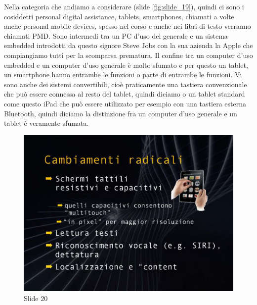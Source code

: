 Nella categoria che andiamo a considerare (slide \ref{fig:slide_19}),  quindi ci sono i cosiddetti personal digital assistance, tablets, smartphones, chiamati a volte anche personal mobile devices, spesso nel corso e anche nei libri di testo verranno chiamati PMD.
Sono intermedi tra un PC d'uso del generale e un sistema embedded introdotti da questo signore Steve Jobs con la sua azienda la Apple che compiangiamo tutti per la scomparsa prematura.
Il confine tra un computer d'uso embedded e un computer d'uso generale è molto sfumato e per questo un tablet, un smartphone hanno entrambe le funzioni o parte di entrambe le funzioni.
Vi sono anche dei sistemi convertibili, cioè praticamente una tastiera convenzionale che può essere connessa al resto del tablet, quindi diciamo o un tablet standard come questo iPad che può essere utilizzato per esempio con una tastiera esterna Bluetooth, quindi diciamo la distinzione fra un computer d'uso generale e un tablet è veramente sfumata.


\begin{figure}[ht]
    \centering
    \includegraphics[width=0.6\linewidth]{images/Lez01_p04_fig_03.png}
    \caption{Slide 20}
    \label{fig:slide_20}
\end{figure}


